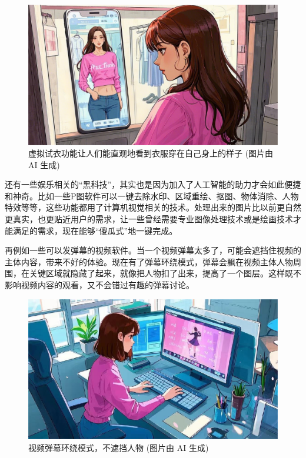 \begin{figure}[htb]
	\centering
	\includegraphics[width=\linewidth]{image/0/虚拟试衣.png}
	\caption{虚拟试衣功能让人们能直观地看到衣服穿在自己身上的样子 (图片由 AI 生成)}
\end{figure}

还有一些娱乐相关的“黑科技”，其实也是因为加入了人工智能的助力才会如此便捷和神奇。比如一些P图软件可以一键去除水印、区域重绘、抠图、物体消除、人物特效等等，这些功能都用了计算机视觉相关的技术。处理出来的图片比以前更自然更真实，也更贴近用户的需求，让一些曾经需要专业图像处理技术或是绘画技术才能满足的需求，现在能够“傻瓜式”地一键完成。

再例如一些可以发弹幕的视频软件。当一个视频弹幕太多了，可能会遮挡住视频的主体内容，带来不好的体验。现在有了弹幕环绕模式，弹幕会飘在视频主体人物周围，在关键区域就隐藏了起来，就像把人物扣了出来，提高了一个图层。这样既不影响视频内容的观看，又不会错过有趣的弹幕讨论。

\begin{figure}[htb]
	\centering
	\includegraphics[width=\linewidth]{image/0/弹幕.jpg}
	\caption{视频弹幕环绕模式，不遮挡人物 (图片由 AI 生成)}
\end{figure}


